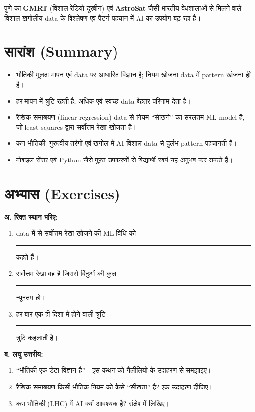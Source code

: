 \begin{bharatai}
पुणे का \textbf{GMRT} (विशाल रेडियो दूरबीन) एवं \textbf{AstroSat} जैसी भारतीय वेधशालाओं
से मिलने वाले विशाल खगोलीय data के विश्लेषण एवं पैटर्न-पहचान में AI का उपयोग बढ़ रहा है।
\end{bharatai}

\section*{सारांश (Summary)}
\begin{itemize}[leftmargin=1.4em]
  \item भौतिकी मूलतः मापन एवं data पर आधारित विज्ञान है; नियम खोजना data में pattern
        खोजना ही है।
  \item हर मापन में त्रुटि रहती है; अधिक एवं स्वच्छ data बेहतर परिणाम देता है।
  \item रैखिक समाश्रयण (linear regression) data से नियम “सीखने” का सरलतम ML model है,
        जो least-squares द्वारा सर्वोत्तम रेखा खोजता है।
  \item कण भौतिकी, गुरुत्वीय तरंगों एवं खगोल में AI विशाल data से दुर्लभ pattern पहचानती है।
  \item मोबाइल सेंसर एवं Python जैसे मुफ़्त उपकरणों से विद्यार्थी स्वयं यह अनुभव कर सकते हैं।
\end{itemize}

\section*{अभ्यास (Exercises)}
\textbf{अ. रिक्त स्थान भरिए:}
\begin{enumerate}[leftmargin=1.6em]
  \item data में से सर्वोत्तम रेखा खोजने की ML विधि को \rule{2.8cm}{0.4pt} कहते हैं।
  \item सर्वोत्तम रेखा वह है जिससे बिंदुओं की कुल \rule{2.8cm}{0.4pt} न्यूनतम हो।
  \item हर बार एक ही दिशा में होने वाली त्रुटि \rule{2.8cm}{0.4pt} त्रुटि कहलाती है।
\end{enumerate}

\textbf{ब. लघु उत्तरीय:}
\begin{enumerate}[leftmargin=1.6em]
  \item “भौतिकी एक डेटा-विज्ञान है” - इस कथन को गैलीलियो के उदाहरण से समझाइए।
  \item रैखिक समाश्रयण किसी भौतिक नियम को कैसे “सीखता” है? एक उदाहरण दीजिए।
  \item कण भौतिकी (LHC) में AI क्यों आवश्यक है? संक्षेप में लिखिए।
\end{enumerate}

